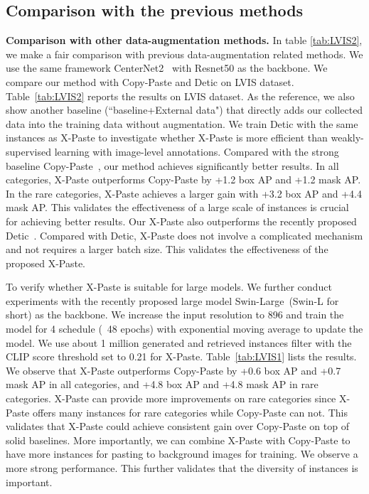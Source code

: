 \documentclass{article}
\begin{document}
\subsection{Comparison with the previous methods}
\label{sec:comp}
\noindent \textbf{Comparison with other data-augmentation methods.}
In table \ref{tab:LVIS2}, we make a fair comparison with previous data-augmentation related methods. We use the same framework CenterNet2~\cite{CenterNet2} with Resnet50 as the backbone. We compare our method with Copy-Paste \cite{Simple-Copy-Paste} and Detic\cite{Detic} on LVIS dataset. Table~\ref{tab:LVIS2} reports the results on LVIS dataset. As the reference, we also show another baseline (``baseline+External data") that directly adds our collected data into the training data without augmentation. We train Detic with the same instances as X-Paste to investigate whether X-Paste is more efficient than weakly-supervised learning with image-level annotations. Compared with the strong baseline Copy-Paste~\cite{Simple-Copy-Paste}, our method achieves significantly better results. In all categories, X-Paste outperforms Copy-Paste by +1.2 box AP and +1.2 mask AP. In the rare categories, X-Paste achieves a larger gain with +3.2 box AP and +4.4 mask AP. This validates the effectiveness of a large scale of instances is crucial for achieving better results. Our X-Paste also outperforms the recently proposed Detic~\cite{Detic}. Compared with Detic, X-Paste does not involve a complicated mechanism and not requires a larger batch size. This validates the effectiveness of the proposed X-Paste.



To verify whether X-Paste is suitable for large models. We further conduct experiments with the recently proposed large model Swin-Large~\cite{Swin}(Swin-L for short) as the backbone. We increase the input resolution to 896 and train the model for 4  schedule (~48 epochs) with exponential moving average to update the model. 
We use about 1 million generated and retrieved instances filter with the CLIP score threshold set to 0.21 for X-Paste. 
Table~\ref{tab:LVIS1} lists the results. We observe that X-Paste outperforms Copy-Paste by +0.6 box AP and +0.7 mask AP in all categories, and +4.8 box AP and +4.8 mask AP in rare categories. X-Paste can provide more improvements on rare categories since X-Paste offers many instances for rare categories while Copy-Paste can not. This validates that X-Paste could achieve consistent gain over Copy-Paste on top of solid baselines. More importantly, we can combine X-Paste with Copy-Paste to have more instances for pasting to background images for training. We observe a more strong performance. This further validates that the diversity of instances is important.
\end{document}
